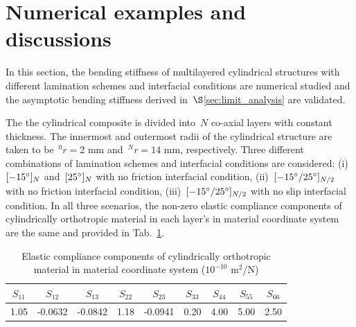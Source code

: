 \documentclass[preprint,10pt,times]{elsarticle}
\numberwithin{equation}{section}
\renewcommand{\>}{$\Rightarrow$}
\begin{document}
\section{Numerical examples and discussions}
\label{sec:discussion}
In this section, the bending stiffness of multilayered cylindrical structures with different lamination schemes and interfacial conditions are numerical studied and the asymptotic bending stiffness derived in~$\S$\ref{sec:limit_analysis} are validated.

The the cylindrical composite is divided into~$N$ co-axial layers with constant thickness.
The innermost and outermost radii of the cylindrical structure are taken to be~${}^{0}\!{r} = 2$ mm and~${}^{N}\!{r} = 14$ mm, respectively.
Three different combinations of lamination schemes and interfacial conditions are considered: (i)~$[-15 \degree]_N$ and~$[25 \degree]_N$ with no friction interfacial condition, (ii)~$[-15 \degree/ 25 \degree]_{N/2}$ with no friction interfacial condition, (iii)~$[-15 \degree/25 \degree]_{N/2}$ with no slip interfacial condition. In all three scenarios, the non-zero elastic compliance components of cylindrically orthotropic material in each layer's in material coordinate system are the same and provided in Tab.~\ref{tab:sij}.
\begin{table}[h]
  \begin{center}
    \caption{Elastic compliance components of cylindrically orthotropic material in material coordinate system ($10^{-10}$ m$^2$/N) }
    \label{tab:sij}
    \begin{tabular}{|c|c|c|c|c|c|c|c|c|}\hline
      $S_{11}$ & $S_{12}$ & $S_{13}$ & $S_{22}$ & $S_{23}$ &
      $S_{33}$ & $S_{44}$ & $S_{55}$ & $S_{66}$  \\ \hline
      1.05 & -0.0632 & -0.0842 & 1.18 & -0.0941 &
      0.20 & 4.00 & 5.00 & 2.50  \\ \hline
    \end{tabular}
  \end{center}
\end{table}
\end{document}
